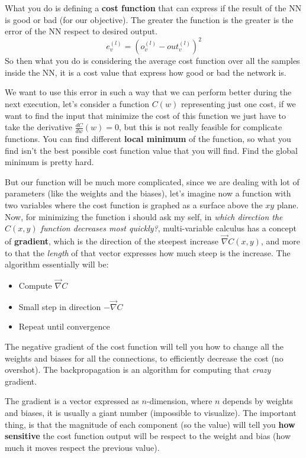 \documentclass{article}
\begin{document}
What you do is defining a \textbf{cost function} that can express if the result of the NN
is good or bad (for our objective). The greater the function is the greater is the error of the
NN respect to desired output.
$$e_v^{(l)}=\left(o_v^{(l)}-out_v^{(l)}\right)^2$$
So then what you do is considering the average cost function over all the samples inside the
NN, it is a cost value that express how good or bad the network is.

We want to use this error in such a way that we can perform better during the next execution,
let's consider a function $C(w)$ representing just one cost, if we want to find the input that
minimize the cost of this function we just have to take the derivative $\frac{dC}{dw}(w)=0$, but
this is not really feasible for complicate functions. You can find different \textbf{local minimum}
of the function, so what you find isn't the best possible cost function value that you will find.
Find the global minimum is pretty hard.

But our function will be much more complicated, since we are dealing with lot of parameters (like
the weights and the biases), let's imagine now a function with two variables where the cost
function is graphed as a surface above the $xy$ plane. Now, for minimizing the function i should
ask my self, in \textit{which direction the $C(x,y)$ function decreases most quickly?}, multi-variable
calculus has a concept of \textbf{gradient}, which is the direction of the steepest increase $\vec{\nabla} C(x,y)$,
and more to that the \textit{length} of that vector expresses how much steep is the increase.
The algorithm essentially will be:
\begin{itemize}
    \item Compute $\vec{\nabla}C$
    \item Small step in direction $-\vec{\nabla}C$
    \item Repeat until convergence
\end{itemize}

The negative gradient of the cost function will tell you how to change all the weights and biases
for all the connections, to efficiently decrease the cost (no overshot). The backpropagation
is an algorithm for computing that \textit{crazy} gradient.

The gradient is a vector expressed as $n$-dimension, where $n$ depends by weights and biases,
it is usually a giant number (impossible to visualize). The important thing, is that the
magnitude of each component (so the value) will tell you \textbf{how sensitive} the
cost function output will be respect to the weight and bias (how much it moves respect the previous
value).
\end{document}
